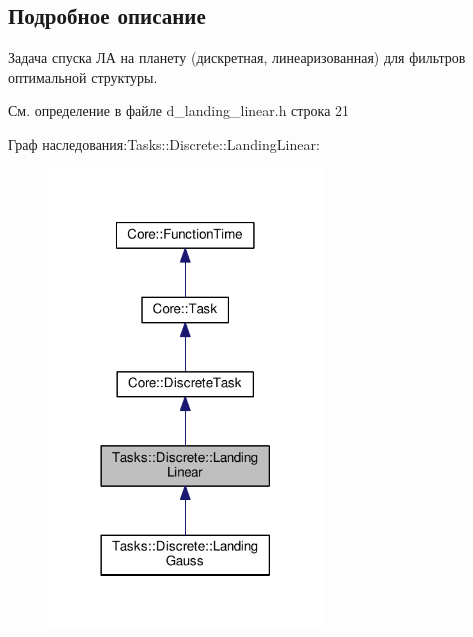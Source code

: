 \subsection{Подробное описание}
Задача спуска ЛА на планету (дискретная, линеаризованная) для фильтров оптимальной структуры. 

См. определение в файле d\+\_\+landing\+\_\+linear.\+h строка 21



Граф наследования\+:Tasks\+:\+:Discrete\+:\+:Landing\+Linear\+:
\nopagebreak
\begin{figure}[H]
\begin{center}
\leavevmode
\includegraphics[width=206pt]{class_tasks_1_1_discrete_1_1_landing_linear__inherit__graph}
\end{center}
\end{figure}


